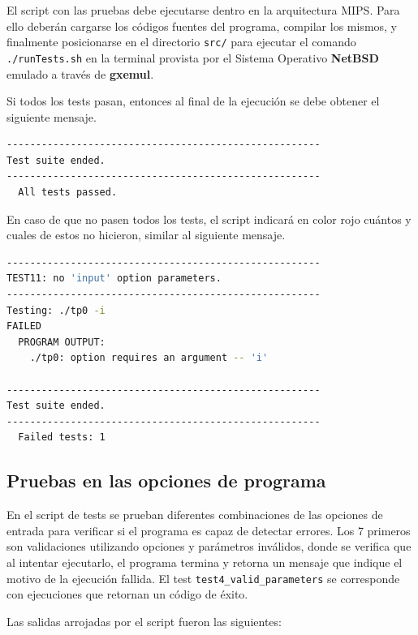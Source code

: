El script con las pruebas debe ejecutarse dentro en la arquitectura MIPS. Para ello deberán cargarse los códigos fuentes del programa, compilar los mismos, y finalmente posicionarse en el directorio \texttt{src/} para ejecutar el comando \texttt{./runTests.sh} en la terminal provista por el Sistema Operativo \textbf{NetBSD} emulado a través de \textbf{gxemul}.

Si todos los tests pasan, entonces al final de la ejecución se debe obtener el siguiente mensaje.
\begin{lstlisting}[language=bash, style=StyleC]
------------------------------------------------------
Test suite ended.
------------------------------------------------------
  All tests passed.
\end{lstlisting}

En caso de que no pasen todos los tests, el script indicará en color rojo cuántos y cuales de estos no hicieron, similar al siguiente mensaje.

\begin{lstlisting}[language=bash, style=StyleC]
------------------------------------------------------
TEST11: no 'input' option parameters.
------------------------------------------------------
Testing: ./tp0 -i 
FAILED 
  PROGRAM OUTPUT:
	./tp0: option requires an argument -- 'i'

------------------------------------------------------
Test suite ended.
------------------------------------------------------
  Failed tests: 1
\end{lstlisting}


\subsection{Pruebas en las opciones de programa}

En el script de tests se prueban diferentes combinaciones de las opciones de entrada para verificar si el programa es capaz de detectar errores. Los 7 primeros son validaciones utilizando opciones y parámetros inválidos, donde se verifica que al intentar ejecutarlo, el programa termina y retorna un mensaje que indique el motivo de la ejecución fallida. El test \texttt{test4\_valid\_parameters} se corresponde con ejecuciones que retornan un código de éxito. 

Las salidas arrojadas por el script fueron las siguientes:



